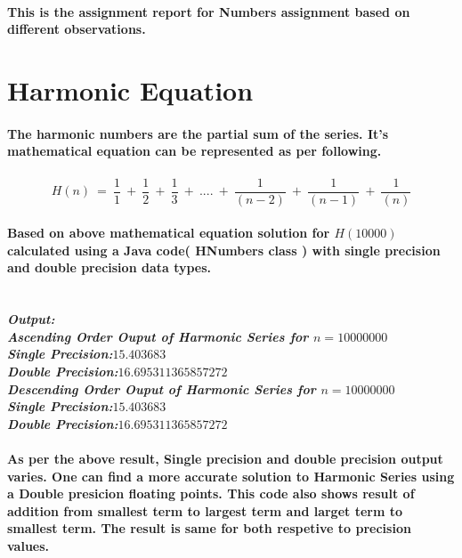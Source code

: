\documentclass[12pt]{article}
\begin{document}
\paragraph{This is the assignment report for Numbers assignment based on different observations.}
\section{Harmonic Equation}
\paragraph{The harmonic numbers are the partial sum of the series. It's mathematical equation can be represented as per following.}
\paragraph{
{\large $$H(n)\ = \ \frac{1}{1} \ + \ \frac{1}{2} \ + \ \frac{1}{3} \ + \ .... \ + \ \frac{1}{(n-2)} \ + \ \frac{1}{(n-1)} \ + \ \frac{1}{(n)}$$}
}
\paragraph{
Based on above mathematical equation solution for $H(10000)$ calculated using a Java code( HNumbers class ) with single precision and double precision data types.\\
}
\textbf{\textit{\\ Output: \\
Ascending Order Ouput of Harmonic Series for $n = 10000000$ \\
Single Precision:$15.403683$ \\
Double Precision:$16.695311365857272$ \\
Descending Order Ouput of Harmonic Series for $n = 10000000$ \\
Single Precision:$15.403683$ \\
Double Precision:$16.695311365857272$}}

\paragraph{As per the above result, Single precision and double precision output varies. One can find a more accurate solution to Harmonic Series using a Double presicion floating points. This code also shows result of addition from smallest term to largest term and larget term to smallest term. The result is same for both respetive to precision values. }
\end{document}
